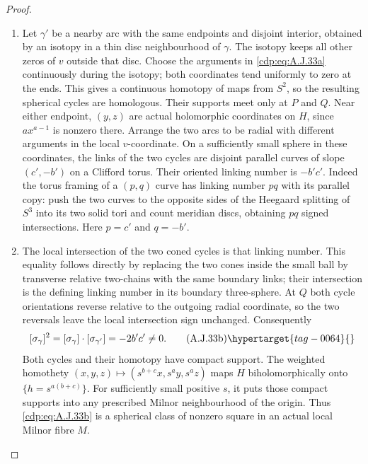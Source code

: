 \begin{proof}
\begin{enumerate}[label={$\langle1\rangle$\arabic*.},leftmargin=*]
\item Let $\gamma'$ be a nearby arc with the same endpoints
and disjoint interior, obtained by an isotopy in a
thin disc neighbourhood of $\gamma$. The isotopy
keeps all other zeros of $v$ outside that disc.
Choose the arguments in \eqref{cdp:eq:A.J.33a} continuously during
the isotopy; both coordinates tend uniformly to zero
at the ends. This gives a continuous homotopy of
maps from $S^2$, so the resulting spherical cycles
are homologous. Their supports meet only at $P$ and
$Q$. Near either endpoint, $(y,z)$ are actual
holomorphic coordinates on $H$, since $a x^{a-1}$
is nonzero there. Arrange the two arcs to be radial
with different arguments in the local $v$-coordinate.
On a sufficiently small sphere in these coordinates,
the links of the two cycles are disjoint parallel
curves of slope $(c',-b')$ on a Clifford torus.
Their oriented linking number is $-b'c'$.
Indeed the torus framing of a $(p,q)$ curve has
linking number $pq$ with its parallel copy: push the
two curves to the opposite sides of the Heegaard
splitting of $S^3$ into its two solid tori and count
meridian discs, obtaining $p q$ signed intersections.
Here $p=c'$ and $q=-b'$.

\item The local intersection of the two coned cycles is
that linking number. This equality follows directly
by replacing the two cones inside the small ball by
transverse relative two-chains with the same boundary
links; their intersection is the defining linking
number in its boundary three-sphere. At $Q$ both
cycle orientations reverse relative to the outgoing
radial coordinate, so the two reversals leave the
local intersection sign unchanged. Consequently
\[
 [\sigma_\gamma]^2
   =[\sigma_\gamma]\cdot[\sigma_{\gamma'}]
   =-2b'c'\ne0.                                  \tag{A.J.33b}\hypertarget{tag-0064}{}\label{cdp:eq:A.J.33b}
\]
Both cycles and their homotopy have compact support.
The weighted homothety
$(x,y,z)\mapsto(s^{b+c}x,s^a y,s^a z)$ maps
$H$ biholomorphically onto $\{h=s^{a(b+c)}\}$.
For sufficiently small positive $s$, it puts those
compact supports into any prescribed Milnor
neighbourhood of the origin. Thus \eqref{cdp:eq:A.J.33b} is a
spherical class of nonzero square in an actual
local Milnor fibre $M$.


\end{enumerate}
\end{proof}
